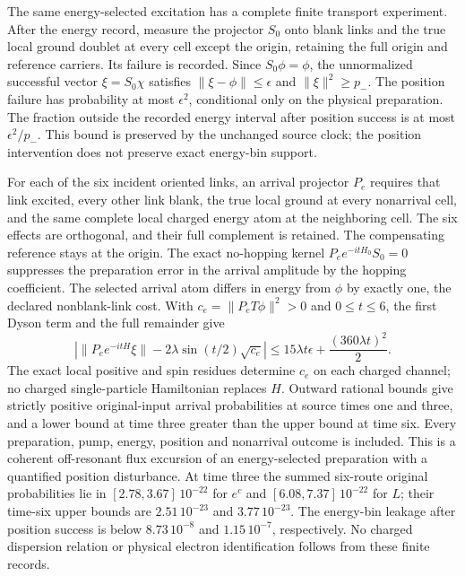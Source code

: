 The same energy-selected excitation has a complete finite transport
experiment. After the energy record, measure the projector $S_0$ onto
blank links and the true local ground doublet at every cell except the
origin, retaining the full origin and reference carriers. Its failure is
recorded. Since $S_0\phi=\phi$, the unnormalized successful vector
$\xi=S_0\chi$ satisfies $\|\xi-\phi\|\leq\epsilon$ and
$\|\xi\|^2\geq p_-$. The position failure has probability at most
$\epsilon^2$, conditional only on the physical preparation. The fraction
outside the recorded energy interval after position success is at most
$\epsilon^2/p_-$. This bound is preserved by the unchanged source clock;
the position intervention does not preserve exact energy-bin support.

For each of the six incident oriented links, an arrival projector $P_e$
requires that link excited, every other link blank, the true local ground
at every nonarrival cell, and the same complete local charged energy atom
at the neighboring cell. The six effects are orthogonal, and their full
complement is retained. The compensating reference stays at the origin.
The exact no-hopping kernel $P_e e^{-itH_0}S_0=0$ suppresses the
preparation error in the arrival amplitude by the hopping coefficient.
The selected arrival atom differs in energy from $\phi$ by exactly one,
the declared nonblank-link cost. With
$c_e=\|P_eT\phi\|^2>0$ and $0\leq t\leq6$, the first Dyson term and
the full remainder give
\[
 \left|\|P_e e^{-itH}\xi\|
       -2\lambda\sin(t/2)\sqrt{c_e}\right|
 \leq15\lambda t\epsilon+
                   \frac{(360\lambda t)^2}{2}.
\]
The exact local positive and spin residues determine $c_e$ on each
charged channel; no charged single-particle Hamiltonian replaces $H$.
Outward rational bounds give strictly positive original-input arrival
probabilities at source times one and three, and a lower bound at time
three greater than the upper bound at time six. Every preparation, pump,
energy, position and nonarrival outcome is included. This is a coherent
off-resonant flux excursion of an energy-selected preparation with a
quantified position disturbance. At time three the summed six-route
original probabilities lie in $[2.78,3.67]\,10^{-22}$ for $e^c$ and
$[6.08,7.37]\,10^{-22}$ for $L$; their time-six upper bounds are
$2.51\,10^{-23}$ and $3.77\,10^{-23}$. The energy-bin leakage after
position success is below $8.73\,10^{-8}$ and $1.15\,10^{-7}$,
respectively. No charged dispersion relation or physical electron
identification follows from these finite records.

